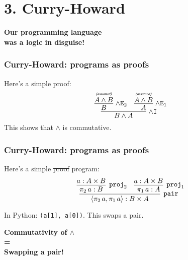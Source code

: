 \documentclass{beamer}
\newcommand{\isassumed}{\textsf{\tiny{\textit{(assumed)}}}}
\newcommand{\assumed}[1]{\deduce{#1}{\isassumed}}
\newcommand{\x}{\times}
\newcommand{\wedgeI}{\!\wedge\rn{I}}
\newcommand{\wedgeE}{\!\wedge\rn{E}}
\begin{document}

\section{3. Curry-Howard}

\begin{frame}
  \begin{center}
    {\Large\bf Our programming language\\ was a logic in disguise!}

  \end{center}
\end{frame}

\begin{frame}
  \begin{center}
    \frametitle{Curry-Howard: programs as proofs}
    Here's a simple proof:
    \[
    \infer[\wedgeI]{B \wedge A}{
      \infer[\wedgeE_2]{B}{\assumed{A \wedge B}}
      &
      \infer[\wedgeE_1]{A}{\assumed{A \wedge B}}
    }
    \]
    This shows that $\wedge$ is commutative.

  \end{center}
\end{frame}

\begin{frame}
  \begin{center}
    \frametitle{Curry-Howard: programs as proofs}
    Here's a simple \sout{proof} {\color{red} program}:
    \[
    \infer[\rn{pair}]{\pair{\projr a}{\projl a} : B \x A}{
      \infer[\rn{proj}_2]{\projr a : B}{a : A \x B}
      &
      \infer[\rn{proj}_1]{\projl a : A}{a : A \x B}
    }
    \]

    In Python: \texttt{(a[1], a[0])}.
    This swaps a pair.

  \end{center}
\end{frame}

\begin{frame}
  \begin{center}
    {\Large\bf Commutativity of $\wedge$ \\=\\\vspace{4pt} Swapping a pair!}
  \end{center}
\end{frame}
\end{document}
